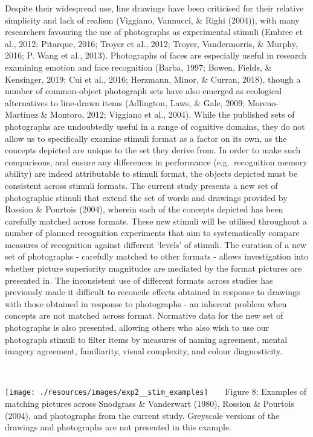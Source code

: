 \documentclass[
  11pt,
]{article}
\begin{document}
Despite their widespread use, line drawings have been criticised for
their relative simplicity and lack of realism (Viggiano, Vannucci, \&
Righi (2004)), with many researchers favouring the use of photographs as
experimental stimuli (Embree et al., 2012; Pitarque, 2016; Troyer et
al., 2012; Troyer, Vandermorris, \& Murphy, 2016; P. Wang et al., 2013).
Photographs of faces are especially useful in research examining emotion
and face recognition (Barba, 1997; Bowen, Fields, \& Kensinger, 2019;
Cui et al., 2016; Herzmann, Minor, \& Curran, 2018), though a number of
common-object photograph sets have also emerged as ecological
alternatives to line-drawn items (Adlington, Laws, \& Gale, 2009;
Moreno-Martínez \& Montoro, 2012; Viggiano et al., 2004). While the
published sets of photographs are undoubtedly useful in a range of
cognitive domains, they do not allow us to specifically examine stimuli
format as a factor on its own, as the concepts depicted are unique to
the set they derive from. In order to make such comparisons, and ensure
any differences in performance (e.g.~recognition memory ability) are
indeed attributable to stimuli format, the objects depicted must be
consistent across stimuli formats. The current study presents a new set
of photographic stimuli that extend the set of words and drawings
provided by Rossion \& Pourtois (2004), wherein each of the concepts
depicted has been carefully matched across formats. These new stimuli
will be utilised throughout a number of planned recognition experiments
that aim to systematically compare measures of recognition against
different `levels' of stimuli. The curation of a new set of photographs
- carefully matched to other formats - allows investigation into whether
picture superiority magnitudes are mediated by the format pictures are
presented in. The inconsistent use of different formats across studies
has previously made it difficult to reconcile effects obtained in
response to drawings with those obtained in response to photographs - an
inherent problem when concepts are not matched across format. Normative
data for the new set of photographs is also presented, allowing others
who also wish to use our photograph stimuli to filter items by measures
of naming agreement, mental imagery agreement, familiarity, visual
complexity, and colour diagnosticity.

~ ~

\texttt{[image: ./resources/images/exp2\_\_stim\_examples]}
~ ~ Figure 8: Examples of matching pictures across Snodgrass \&
Vanderwart (1980), Rossion \& Pourtois (2004), and photographs from the
current study. Greyscale versions of the drawings and photographs are
not presented in this example. ~ ~
\end{document}
